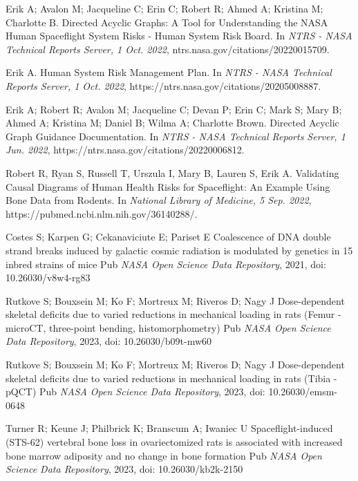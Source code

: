 \documentclass{article}
\begin{document}
\begin{thebibliography}{1}


\bibitem{}
Erik A; Avalon M; Jacqueline C; Erin C; Robert R; Ahmed A; Kristina M; Charlotte B.
\newblock Directed Acyclic Graphs: A Tool for Understanding the NASA Human Spaceflight System Risks - Human System Risk Board.
\newblock In {\em NTRS - NASA Technical Reports Server, 1 Oct. 2022}, ntrs.nasa.gov/citations/20220015709.

\bibitem{}
Erik A.
\newblock Human System Risk Management Plan.
\newblock In {\em NTRS - NASA Technical Reports Server, 1 Oct. 2022}, https://ntrs.nasa.gov/citations/20205008887.

\bibitem{}
Erik A; Robert R; Avalon M; Jacqueline C; Devan P; Erin C; Mark S; Mary B; Ahmed A; Kristina M; Daniel B; Wilma A; Charlotte Brown.
\newblock Directed Acyclic Graph Guidance Documentation.
\newblock In {\em NTRS - NASA Technical Reports Server, 1 Jun. 2022}, https://ntrs.nasa.gov/citations/20220006812.

\bibitem{}
Robert R, Ryan S, Russell T, Urszula I, Mary B, Lauren S, Erik A.
\newblock Validating Causal Diagrams of Human Health Risks for Spaceflight: An Example Using Bone Data from Rodents.
\newblock In {\em National Library of Medicine, 5 Sep. 2022}, https://pubmed.ncbi.nlm.nih.gov/36140288/.

\bibitem{}
Costes S; Karpen G; Cekanaviciute E; Pariset E
\newblock Coalescence of DNA double strand breaks induced by galactic cosmic radiation is modulated by genetics in 15 inbred strains of mice
\newblock Pub {\em NASA Open Science Data Repository}, 2021, doi: 10.26030/v8w4-rg83

\bibitem{}
Rutkove S; Bouxsein M; Ko F; Mortreux M; Riveros D; Nagy J
\newblock Dose-dependent skeletal deficits due to varied reductions in mechanical loading in rats (Femur - microCT, three-point bending, histomorphometry)
\newblock Pub {\em NASA Open Science Data Repository}, 2023, doi: 10.26030/b09t-mw60

\bibitem{}
Rutkove S; Bouxsein M; Ko F; Mortreux M; Riveros D; Nagy J
\newblock Dose-dependent skeletal deficits due to varied reductions in mechanical loading in rats (Tibia - pQCT)
\newblock Pub {\em NASA Open Science Data Repository}, 2023, doi: 10.26030/emsm-0648

\bibitem{}
Turner R; Keune J; Philbrick K; Branscum A; Iwaniec U
\newblock Spaceflight-induced (STS-62) vertebral bone loss in ovariectomized rats is associated with increased bone marrow adiposity and no change in bone formation
\newblock Pub {\em NASA Open Science Data Repository}, 2023, doi: 10.26030/kb2k-2150


\end{thebibliography}
\end{document}
